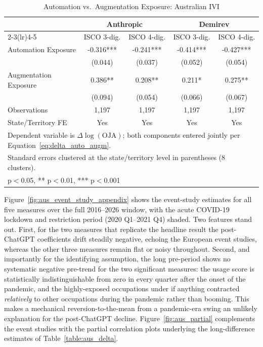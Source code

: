 \documentclass[11pt]{article}
\begin{document}
\begin{table}[H]
\centering
\caption{Automation vs.\ Augmentation Exposure: Australian IVI}
\begin{tabular}{lcccc}
\hline\hline
 & \multicolumn{2}{c}{Anthropic} & \multicolumn{2}{c}{Demirev} \\
\cmidrule(lr){2-3}\cmidrule(lr){4-5}
 & ISCO 3-dig. & ISCO 4-dig. & ISCO 3-dig. & ISCO 4-dig. \\
\midrule
Automation Exposure & -0.316*** & -0.241*** & -0.414*** & -0.427*** \\
 & (0.044) & (0.037) & (0.052) & (0.054) \\
Augmentation Exposure & 0.386** & 0.208** & 0.211* & 0.275** \\
 & (0.094) & (0.054) & (0.066) & (0.067) \\
\midrule
Observations & 1,197 & 1,197 & 1,197 & 1,197 \\
State/Territory FE & Yes & Yes & Yes & Yes \\
\hline\hline
\multicolumn{5}{l}{\footnotesize Dependent variable is $\Delta \log(\text{OJA})$; both components entered jointly per Equation~\ref{eq:delta_auto_augm}.} \\
\multicolumn{5}{l}{\footnotesize Standard errors clustered at the state/territory level in parentheses (8 clusters).} \\
\multicolumn{5}{l}{\footnotesize * p$<$0.05, ** p$<$0.01, *** p$<$0.001} \\
\end{tabular}
\label{table:aus_intent}
\end{table}

Figure~\ref{fig:aus_event_study_appendix} shows the event-study estimates for all five measures over the full 2016--2026 window, with the acute COVID-19 lockdown and restriction period (2020 Q1--2021 Q4) shaded. Two features stand out. First, for the two measures that replicate the headline result the post-ChatGPT coefficients drift steadily negative, echoing the European event studies, whereas the other three measures remain flat or noisy throughout. Second, and importantly for the identifying assumption, the long pre-period shows no systematic negative pre-trend for the two significant measures: the \citet{handa2025economic} usage score is statistically indistinguishable from zero in every quarter after the onset of the pandemic, and the highly-exposed occupations under \citet{demirev2024assessing} if anything contracted \emph{relatively} to other occupations during the pandemic rather than booming. This makes a mechanical reversion-to-the-mean from a pandemic-era swing an unlikely explanation for the post-ChatGPT decline. Figure~\ref{fig:aus_partial} complements the event studies with the partial correlation plots underlying the long-difference estimates of Table~\ref{table:aus_delta}.
\end{document}
